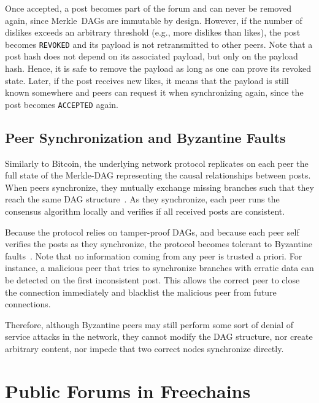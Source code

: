 \documentclass[12pt]{article}
\newcommand{\code}[1]  {\texttt{\footnotesize{#1}}}
\begin{document}
Once accepted, a post becomes part of the forum and can never be removed
again, since Merkle~DAGs are immutable by design.
%
However, if the number of dislikes exceeds an arbitrary threshold (e.g., more
dislikes than likes), the post becomes \code{REVOKED} and its payload is not
retransmitted to other peers.
Note that a post hash does not depend on its associated payload, but only on
the payload hash.
Hence, it is safe to remove the payload as long as one can prove its revoked
state.
Later, if the post receives new likes, it means that the payload is still known
somewhere and peers can request it when synchronizing again, since the post
becomes \code{ACCEPTED} again.

\subsection{Peer Synchronization and Byzantine Faults}

Similarly to Bitcoin, the underlying network protocol replicates on each peer
the full state of the Merkle-DAG representing the causal relationships between
posts.
When peers synchronize, they mutually exchange missing branches such that they
reach the same DAG structure~\cite{p2p.byz}.
As they synchronize, each peer runs the consensus algorithm locally and
verifies if all received posts are consistent.

Because the protocol relies on tamper-proof DAGs, and because each peer self
verifies the posts as they synchronize, the protocol becomes tolerant to
Byzantine faults~\cite{lamport.byz}.
%
Note that no information coming from any peer is trusted a priori.
%
For instance, a malicious peer that tries to synchronize branches with erratic
data can be detected on the first inconsistent post.
This allows the correct peer to close the connection immediately and blacklist
the malicious peer from future connections.

Therefore, although Byzantine peers may still perform some sort of denial of
service attacks in the network, they cannot modify the DAG structure, nor
create arbitrary content, nor impede that two correct nodes synchronize
directly.

\section{Public Forums in Freechains}
\label{sec.freechains}
\end{document}
